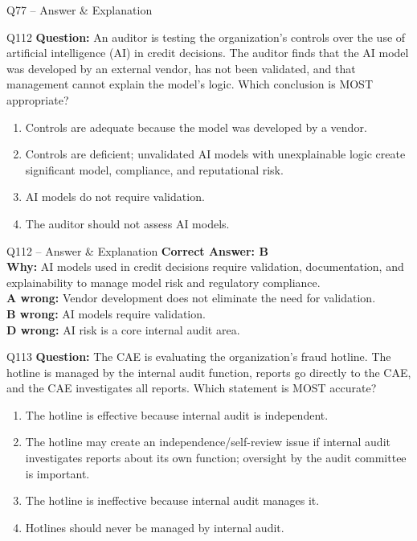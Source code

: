 \documentclass[aspectratio=169,10pt]{beamer}
\begin{document}
\begin{frame}[t]{Q77 -- Answer \& Explanation}
	\begin{frame}[t]{Q112}
		\small
		\textbf{Question:} An auditor is testing the organization's controls over the use of artificial intelligence (AI) in credit decisions. The auditor finds that the AI model was developed by an external vendor, has not been validated, and that management cannot explain the model's logic. Which conclusion is MOST appropriate?
		\begin{enumerate}[label=\Alph*.,itemsep=1pt,topsep=2pt]
			\item Controls are adequate because the model was developed by a vendor.
			\item Controls are deficient; unvalidated AI models with unexplainable logic create significant model, compliance, and reputational risk.
			\item AI models do not require validation.
			\item The auditor should not assess AI models.
		\end{enumerate}
	\end{frame}
	
	\begin{frame}[t]{Q112 -- Answer \& Explanation}
		\small
		\textbf{Correct Answer: B} \\[4pt]
		\textbf{Why:} AI models used in credit decisions require validation, documentation, and explainability to manage model risk and regulatory compliance. \\[4pt]
		\textbf{A wrong:} Vendor development does not eliminate the need for validation. \\[2pt]
		\textbf{B wrong:} AI models require validation. \\[2pt]
		\textbf{D wrong:} AI risk is a core internal audit area.
	\end{frame}
	
	\begin{frame}[t]{Q113}
		\small
		\textbf{Question:} The CAE is evaluating the organization's fraud hotline. The hotline is managed by the internal audit function, reports go directly to the CAE, and the CAE investigates all reports. Which statement is MOST accurate?
		\begin{enumerate}[label=\Alph*.,itemsep=1pt,topsep=2pt]
			\item The hotline is effective because internal audit is independent.
			\item The hotline may create an independence/self-review issue if internal audit investigates reports about its own function; oversight by the audit committee is important.
			\item The hotline is ineffective because internal audit manages it.
			\item Hotlines should never be managed by internal audit.
		\end{enumerate}
	\end{frame}
	

\end{frame}
\end{document}
